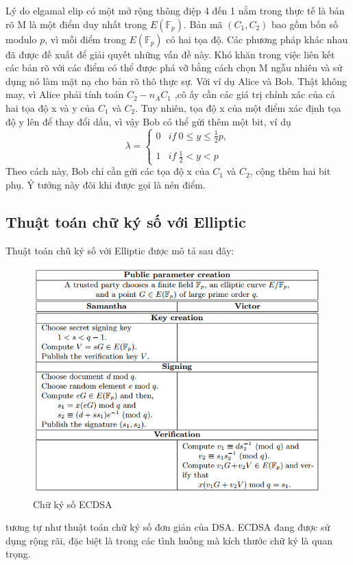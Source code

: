 \documentclass[a4paper,12pt]{report}
\begin{document}
Lý do elgamal elip có một mở rộng thông điệp 4 đến 1 nằm trong thực tế là bản rõ M là một điểm duy nhất trong $E(\mathbb{F}_p)$. Bản mã $(C_1, C_2)$ bao gồm bốn số modulo $p$, vì mỗi điểm trong $E(\mathbb{F}_p)$ có hai tọa độ. Các phương pháp khác nhau đã được đề xuất để giải quyết những vấn đề này. Khó khăn trong việc liên kết các bản rõ với các điểm có thể được phá vỡ bằng cách chọn M ngẫu nhiên và sử dụng nó làm mặt nạ cho bản rõ thô thực sự.
Với ví dụ Alice và Bob. Thật không may, vì Alice phải tính toán $C_2 - n_AC_1$ ,cô ấy cần các giá trị chính xác của cả hai tọa độ x và y của $C_1$ và $C_2$. Tuy nhiên, tọa độ x của một điểm xác định tọa độ y lên để thay đổi dấu, vì vậy Bob có thể gửi thêm một bit, ví dụ
\begin{displaymath}
\lambda = \left\{ \begin{array}{ll}
\displaystyle 0 & if \  0 \leq y \leq \frac{1}{2}p,\\
\\
\displaystyle 1 & if \ \frac{1}{2} < y < p
\end{array} \right.
\end{displaymath}
Theo cách này, Bob chỉ cần gửi các tọa độ x của $C_1$ và $C_2$, cộng thêm hai bit phụ. Ý tưởng này đôi khi được gọi là nén điểm.
\subsection*{Thuật toán chữ ký số với Elliptic}
Thuật toán chũ ký số với Elliptic được mô tả sau đây:\\
\begin{figure}[H]
\begin{center}
\includegraphics[scale=0.9]{../im6.png}
\caption{Chữ ký số ECDSA}
\end{center}
\end{figure}
tương tự như thuật toán chữ ký số đơn giản của DSA. ECDSA đang được sử dụng rộng rãi, đặc biệt là trong các tình huống mà kích thước chữ ký là quan trọng. \\
\end{document}
